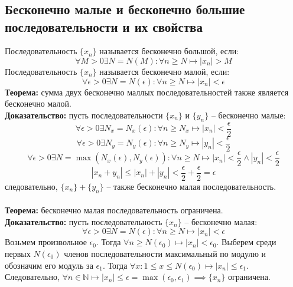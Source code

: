 \documentclass{article}
\begin{document}
    \newpage

    \section{}
    \subsection*{Бесконечно малые и бесконечно большие последовательности и их свойства}
        Последовательность $\{x_n\}$ называется бесконечно большой, если:
        \[ \forall M > 0 \exists N = N(M): \forall n \ge N \longmapsto |x_n| > M \]
        Последовательность $\{x_n\}$ называется бесконечно малой, если:
        \[ \forall \epsilon > 0 \exists N = N(\epsilon): \forall n \ge N \longmapsto |x_n| < \epsilon \]
        \textbf{Теорема:} сумма двух бесконечно маллых последовательностей также является бесконечно малой.
        \\
        \textbf{Доказательство:}
        пусть последовательности $\{x_n\}$ и $\{y_n\}$ -- бесконечно малые:
        \[ \forall \epsilon > 0 \exists N_x = N_x(\epsilon): \forall n \ge N_x \longmapsto |x_n| < \frac{\epsilon}{2} \]
        \[ \forall \epsilon > 0 \exists N_y = N_y(\epsilon): \forall n \ge N_y \longmapsto |y_n| < \frac{\epsilon}{2} \]
        \[ \forall \epsilon > 0 \exists N = \max (N_x(\epsilon), N_y(\epsilon)): \forall n \ge N \longmapsto |x_n| < \frac{\epsilon}{2} \wedge |y_n| < \frac{\epsilon}{2} \]
        \[ |x_n + y_n| \le |x_n| + |y_n| < \frac{\epsilon}{2} + \frac{\epsilon}{2} = \epsilon \]
        следовательно, $\{x_n\} + \{y_n\}$ -- также бесконечно малая последовательность.
        \\
        \\
        \textbf{Теорема:} бесконечно малая последовательность ограничена.
        \\
        \textbf{Доказательство:}
        пусть последовательность $\{x_n\}$ -- бесконечно малая:
        \[ \forall \epsilon > 0 \exists N = N(\epsilon): \forall n \ge N \longmapsto |x_n| < \epsilon \]
        Возьмем произвольное $\epsilon_0$. Тогда $\forall n \ge N(\epsilon_0) \longmapsto |x_n| < \epsilon_0$.
        Выберем среди первых $N(\epsilon_0)$ членов последовательности максимальный по модулю и обозначим его модуль за $\epsilon_1$.
        Тогда $\forall x: 1 \le x \le N(\epsilon_0) \longmapsto |x_n| \le \epsilon_1$.
        Следовательно, $\forall n \in \mathbb{N} \longmapsto |x_n| \le \epsilon = \max(\epsilon_0, \epsilon_1) \implies \{x_n\}$ ограничена.
        \\
\end{document}
